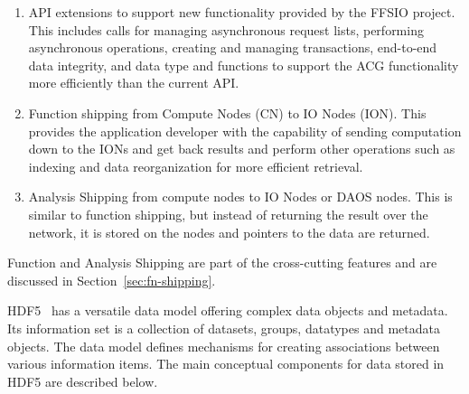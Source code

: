 \documentclass[conference]{IEEEtran} \pdfpagewidth=8.5in
\begin{document}
\begin{enumerate}
\def\labelenumi{\arabic{enumi}.}

\item
  API extensions to support new functionality provided by the FFSIO project.
  This includes calls for managing asynchronous request lists, performing
  asynchronous operations, creating and managing transactions, end-to-end data
  integrity, and data type and functions to support the ACG functionality more
  efficiently than the current API.

\item
  Function shipping from Compute Nodes (CN) to IO Nodes (ION). This provides
  the application developer with the capability of sending computation down to
  the IONs and get back results and perform other operations such as indexing
  and data reorganization for more efficient retrieval.

\item
  Analysis Shipping from compute nodes to IO Nodes or DAOS nodes. This is
  similar to function shipping, but instead of returning the result over the
  network, it is stored on the nodes and pointers to the data are returned.

\end{enumerate}

Function and Analysis Shipping are part of the cross-cutting features and are
discussed in Section~\ref{sec:fn-shipping}.

HDF5~\cite{hdf5} has a versatile data model offering complex data objects
and metadata. Its information set is a collection of datasets, groups,
datatypes and metadata objects. The data model defines mechanisms for
creating associations between various information items. The main
conceptual components for data stored in HDF5 are described below.
\end{document}
